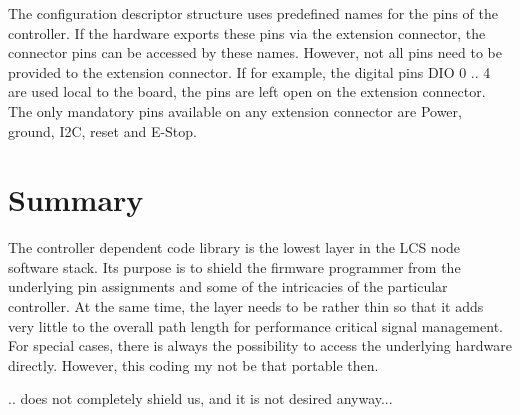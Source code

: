 The configuration descriptor structure uses predefined names for the pins of the controller. If the hardware exports these pins via the extension connector, the connector pins can be accessed by these names. However, not all pins need to be provided to the extension connector. If for example, the digital pins DIO 0 .. 4 are used local to the board, the pins are left open on the extension connector. The only mandatory pins available on any extension connector are Power, ground, I2C, reset and E-Stop.

\section{Summary}

The controller dependent code library is the lowest layer in the LCS node software stack. Its purpose is to shield the firmware programmer from the underlying pin assignments and some of the intricacies of the particular controller. At the same time, the layer needs to be rather thin so that it adds very little to the overall path length for performance critical signal management. For special cases, there is always the possibility to access the underlying hardware directly. However, this coding my not be that portable then.

.. does not completely shield us, and it is not desired anyway...

